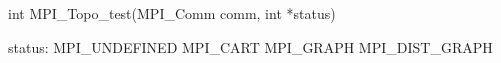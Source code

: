 int MPI_Topo_test(MPI_Comm comm, int *status)

status:
MPI_UNDEFINED
MPI_CART
MPI_GRAPH
MPI_DIST_GRAPH
